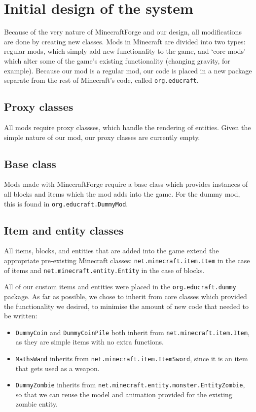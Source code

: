 \section{Initial design of the system}
Because of the very nature of MinecraftForge and our design, 
all modifications are done by creating new classes. Mods in Minecraft
are divided into two types: regular mods, which simply add new
functionality to the game, and `core mods' which alter some of the
game's existing functionality (changing gravity, for example).
Because our mod is a regular mod, our code is placed in a new package
separate from the rest of Minecraft's code, called \texttt{org.educraft}.

\subsection{Proxy classes}
All mods require proxy classses, which handle the rendering of entities.
Given the simple nature of our mod, our proxy classes are currently empty.

\subsection{Base class}
Mods made with MinecraftForge require a base class which provides instances
of all blocks and items which the mod adds into the game. For the dummy mod,
this is found in \texttt{org.educraft.DummyMod}.

\subsection{Item and entity classes}
All items, blocks, and entities that are added into the game extend the appropriate
pre-existing Minecraft classes: \texttt{net.minecraft.item.Item} in the case of
items and \texttt{net.minecraft.entity.Entity} in the case of blocks.

All of our custom items and entities were placed in the \texttt{org.educraft.dummy}
package. As far as possible, we chose to inherit from core classes which provided
the functionality we desired, to minimise the amount of new code that needed
to be written:
\begin{itemize}
    \item{\texttt{DummyCoin} and \texttt{DummyCoinPile} both inherit from 
            \texttt{net.minecraft.item.Item}, as they are simple items with no extra
            functions.}
    \item{\texttt{MathsWand} inherits from \texttt{net.minecraft.item.ItemSword},
            since it is an item that gets used as a weapon.}
    \item{\texttt{DummyZombie} inherits from \texttt{net.minecraft.entity.monster.EntityZombie},
            so that we can reuse the model and animation provided for the existing
            zombie entity.}
\end{itemize}

